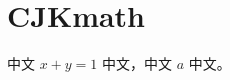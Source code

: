 \documentclass[a4paper,10pt,UTF8,scheme=chinese]{ctexart}
\begin{document}
\section{CJKmath}
中文 $x+y=1$ 中文，中文 $a$ 中文。
\end{document}
